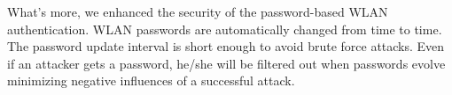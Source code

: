 What’s more, we enhanced the security of the password-based WLAN authentication. WLAN passwords are automatically changed from time to time. The password update interval is short enough to avoid brute force attacks. Even if an attacker gets a password, he/she will be filtered out when passwords evolve minimizing negative influences of a successful attack. 
